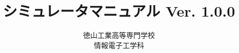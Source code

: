 \documentclass[a4paper,11pt,twocolumn]{ltjsbook}
\newcommand{\ver}{Ver. 1.0.0}
\begin{document}
\title{\tac シミュレータマニュアル \ver}
\author{徳山工業高等専門学校\\情報電子工学科}
\date{}
\maketitle

\setcounter{tocdepth}{2}
\tableofcontents

\mainmatter





\vfill
\end{document}
